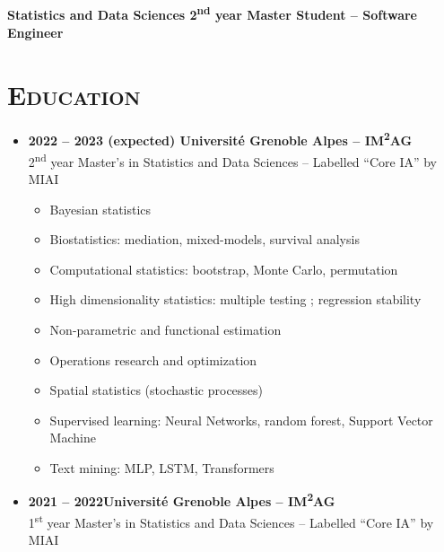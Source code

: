 \documentclass{article}
\begin{document}
\begin{minipage}{0.8\textwidth}
\begin{flushleft}
\begin{minipage}{1\textwidth}
\begin{minipage}{.5\textwidth}
\begin{flushright}
\begin{minipage}{.24\textwidth}
\begin{flushright}
            \end{flushright}
            \end{minipage}
        \end{flushright}
        \end{minipage}
    \end{minipage}
    \\[.3 cm]
    \textbf{Statistics and Data Sciences 2\textsuperscript{nd} year Master Student – Software Engineer}
    \\[.5 cm]
    \section*{\textsc{Education}}
    \begin{itemize}
        \item \textbf{2022 – 2023 (expected) \qquad Université Grenoble Alpes – IM\textsuperscript{2}AG} \\
        2\textsuperscript{nd} year Master’s in Statistics and Data Sciences – Labelled “Core IA” by MIAI
        \vspace{-.15cm}
        \begin{itemize}[leftmargin=*]
        \setlength\itemsep{.01cm}
            \item Bayesian statistics
            \item Biostatistics: mediation, mixed-models, survival analysis
            \item Computational statistics: bootstrap, Monte Carlo, permutation
            \item High dimensionality statistics: multiple testing ; regression stability
            \item Non-parametric and functional estimation
            \item Operations research and optimization
            \item Spatial statistics (stochastic processes)
            \item Supervised learning: Neural Networks, random forest, Support Vector Machine
            \item Text mining: MLP, LSTM, Transformers
        \end{itemize}
        \item \textbf{2021 – 2022\qquad \qquad \qquad \qquad Université Grenoble Alpes – IM\textsuperscript{2}AG} \\
        1\textsuperscript{st} year Master’s in Statistics and Data Sciences – Labelled “Core IA” by MIAI
        \vspace{-.15cm}

\end{itemize}
\end{flushleft}
\end{minipage}
\end{document}
